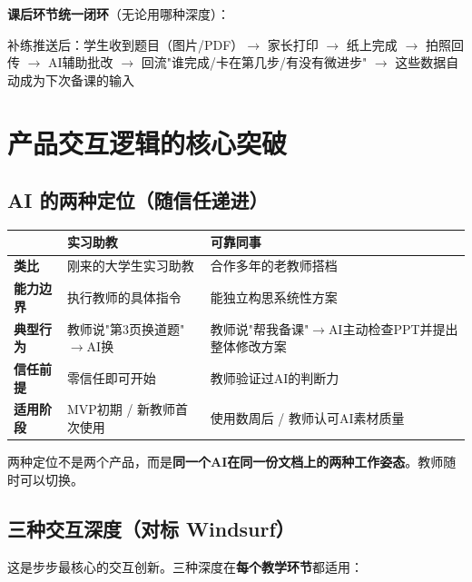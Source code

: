 \documentclass[11pt,a4paper]{article}
\begin{document}
\bigskip
\noindent\textbf{课后环节统一闭环}（无论用哪种深度）：

\begin{notebox}
补练推送后：学生收到题目（图片/PDF）$\rightarrow$ 家长打印 $\rightarrow$ 纸上完成 $\rightarrow$ 拍照回传 $\rightarrow$ AI辅助批改 $\rightarrow$ 回流"谁完成/卡在第几步/有没有微进步" $\rightarrow$ 这些数据自动成为下次备课的输入
\end{notebox}

\section{产品交互逻辑的核心突破}

\subsection{AI 的两种定位（随信任递进）}

\begin{center}\small
\begin{tabularx}{\textwidth}{>{\bfseries}l Y Y}
\toprule
{} & \textbf{实习助教} & \textbf{可靠同事} \\
\midrule
类比 & 刚来的大学生实习助教 & 合作多年的老教师搭档 \\
 能力边界 & 执行教师的具体指令 & 能独立构思系统性方案 \\
典型行为 & 教师说"第3页换道题"$\rightarrow$AI换 & 教师说"帮我备课"$\rightarrow$AI主动检查PPT并提出整体修改方案 \\
 信任前提 & 零信任即可开始 & 教师验证过AI的判断力 \\
适用阶段 & MVP初期 / 新教师首次使用 & 使用数周后 / 教师认可AI素材质量 \\
\bottomrule
\end{tabularx}
\end{center}

两种定位不是两个产品，而是\textbf{同一个AI在同一份文档上的两种工作姿态}。教师随时可以切换。

\subsection{三种交互深度（对标 Windsurf）}

这是步步最核心的交互创新。三种深度在\textbf{每个教学环节}都适用：
\end{document}
